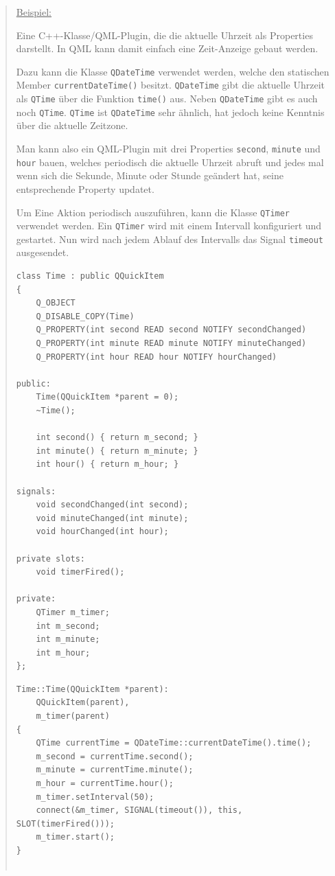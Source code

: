 \documentclass[a4paper]{article}
\begin{document}
\begin{quote}
\uline{Beispiel:}

Eine C++-Klasse/QML-Plugin, die die aktuelle Uhrzeit als Properties darstellt. In QML kann damit einfach eine Zeit-Anzeige gebaut werden.

Dazu kann die Klasse \verb~QDateTime~ verwendet werden, welche den statischen Member \verb~currentDateTime()~ besitzt. \verb~QDateTime~ gibt die aktuelle Uhrzeit als \verb~QTime~ über die Funktion \verb~time()~ aus. Neben \verb~QDateTime~ gibt es auch noch \verb~QTime~. \verb~QTime~ ist \verb~QDateTime~ sehr ähnlich, hat jedoch keine Kenntnis über die aktuelle Zeitzone.

Man kann also ein QML-Plugin mit drei Properties \verb~second~, \verb~minute~ und \verb~hour~ bauen, welches periodisch die aktuelle Uhrzeit abruft und jedes mal wenn sich die Sekunde, Minute oder Stunde geändert hat, seine entsprechende Property updatet.

Um Eine Aktion periodisch auszuführen, kann die Klasse \verb~QTimer~ verwendet werden. Ein \verb~QTimer~ wird mit einem Intervall konfiguriert und gestartet. Nun wird nach jedem Ablauf des Intervalls das Signal \verb~timeout~ ausgesendet.

\begin{verbatim}
class Time : public QQuickItem
{
    Q_OBJECT
    Q_DISABLE_COPY(Time)
    Q_PROPERTY(int second READ second NOTIFY secondChanged)
    Q_PROPERTY(int minute READ minute NOTIFY minuteChanged)
    Q_PROPERTY(int hour READ hour NOTIFY hourChanged)

public:
    Time(QQuickItem *parent = 0);
    ~Time();

    int second() { return m_second; }
    int minute() { return m_minute; }
    int hour() { return m_hour; }

signals:
    void secondChanged(int second);
    void minuteChanged(int minute);
    void hourChanged(int hour);

private slots:
    void timerFired();

private:
    QTimer m_timer;
    int m_second;
    int m_minute;
    int m_hour;
};
\end{verbatim}

\begin{verbatim}
Time::Time(QQuickItem *parent):
    QQuickItem(parent),
    m_timer(parent)
{
    QTime currentTime = QDateTime::currentDateTime().time();
    m_second = currentTime.second();
    m_minute = currentTime.minute();
    m_hour = currentTime.hour();
    m_timer.setInterval(50);
    connect(&m_timer, SIGNAL(timeout()), this, SLOT(timerFired()));
    m_timer.start();
}


\end{verbatim}
\end{quote}
\end{document}
